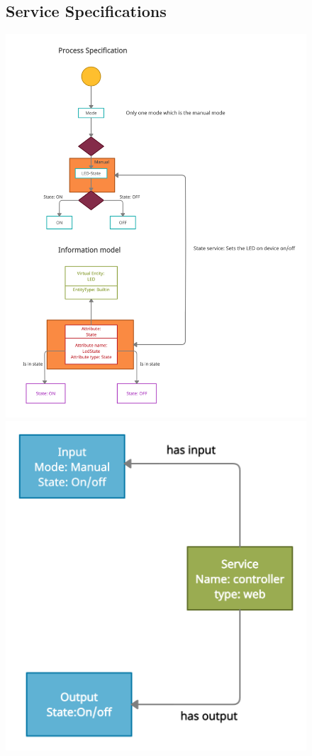 \documentclass{report}
\begin{document}
\begin{figure}
\subsection{Service Specifications}
    \centering
    \includegraphics[scale=0.1]{images/step5.png}
    \includegraphics[scale=0.2]{images/step5 (1).png}

\end{figure}
\end{document}
